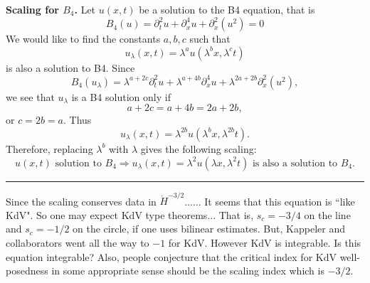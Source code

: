 \documentclass[12pt,reqno]{amsart}
\numberwithin{equation}{section}  %
\numberwithin{figure}{section}
\begin{document}
%
%
%
%
{ \bf Scaling  for $B_4$.}
%
%
Let $u(x, t)$ be a solution to the B4 equation, that is
%
$$
B_4(u)=
 \partial_t^2u + \partial^4_x u + \partial_x^2(u^2)  = 0
$$
%
We would like to find the constants
$a, b, c$ such that
\[
u_\lambda (x, t) = \lambda^a u(\lambda^b x, \lambda^c t)
\]
is also a solution to B4.  Since 
$$
B_4(u_\lambda)=
\lambda^{a+2c} \partial_t^2u 
+
 \lambda^{a+4b} \partial^4_x u 
 +
  \lambda^{2a+2b}
  \partial_x^2(u^2),  
$$
we see that $u_\lambda$ is a B4 solution only if
$$
a+2c=a+4b=2a+2b,
$$
or
$
c= 2b =a.
$
  Thus
\[
u_\lambda (x, t) = \lambda^{2b} u(\lambda^{b}x,  \lambda^{2b} t).
\]
%
%
Therefore, replacing  $ \lambda^b$ with  $ \lambda$ gives the following scaling:
%
\begin{equation}
\label{DP-scal}
\boxed{
u(x, t) \text{ solution to }  B_4 
 \Longrightarrow 
u_\lambda (x, t) = \lambda^2 u(\lambda x, \lambda^2 t)  \text { is also a solution to }  B_4. 
}
\end{equation}


\hrule
\vskip0.1in
%
Since the scaling conserves data in $\dot{H}^{-3/2}$......
It seems that this equation is ``like KdV".
So one may expect KdV type theorems...
That is, $s_c=-3/4$ on the line and $s_c=-1/2$ on the circle,
if one uses bilinear estimates.
But, Kappeler and collaborators went all the way to $-1$ for KdV.
However KdV is integrable. Is this equation integrable?
Also, people conjecture that the critical index for KdV well-posedness 
in some appropriate sense should be the scaling index which is  $-3/2$.



%
%
%
%
%
%
%
%
\end{document}
